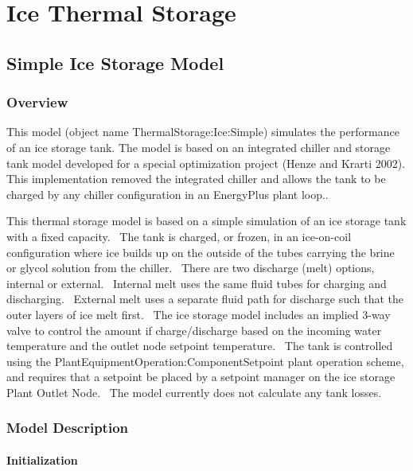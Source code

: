 \section{Ice Thermal Storage }\label{ice-thermal-storage}

\subsection{Simple Ice Storage Model}\label{simple-ice-storage-model}

\subsubsection{Overview}\label{overview-020}

This model (object name ThermalStorage:Ice:Simple) simulates the performance of an ice storage tank. The model is based on an integrated chiller and storage tank model developed for a special optimization project (Henze and Krarti 2002). This implementation removed the integrated chiller and allows the tank to be charged by any chiller configuration in an EnergyPlus plant loop..

This thermal storage model is based on a simple simulation of an ice storage tank with a fixed capacity.~ The tank is charged, or frozen, in an ice-on-coil configuration where ice builds up on the outside of the tubes carrying the brine or glycol solution from the chiller.~ There are two discharge (melt) options, internal or external.~ Internal melt uses the same fluid tubes for charging and discharging.~ External melt uses a separate fluid path for discharge such that the outer layers of ice melt first.~ The ice storage model includes an implied 3-way valve to control the amount if charge/discharge based on the incoming water temperature and the outlet node setpoint temperature.~ The tank is controlled using the PlantEquipmentOperation:ComponentSetpoint plant operation scheme, and requires that a setpoint be placed by a setpoint manager on the ice storage Plant Outlet Node.~ The model currently does not calculate any tank losses.

\subsubsection{Model Description}\label{model-description-013}

\paragraph{Initialization}\label{initialization-000}

